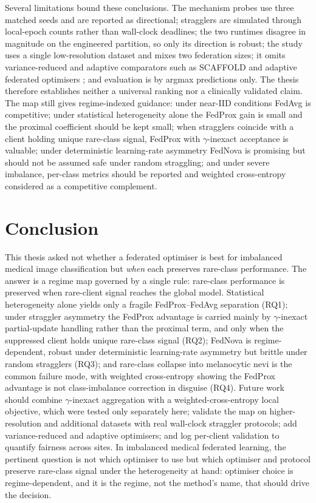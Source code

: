 \documentclass[11pt,a4paper]{report}
\begin{document}
Several limitations bound these conclusions. The mechanism probes use three
matched seeds and are reported as directional; stragglers are simulated through
local-epoch counts rather than wall-clock deadlines; the two runtimes disagree in
magnitude on the engineered partition, so only its direction is robust; the study
uses a single low-resolution dataset and mixes two federation sizes; it omits
variance-reduced and adaptive comparators such as SCAFFOLD
\citep{karimireddy2020scaffold} and adaptive federated optimisers
\citep{reddi2021adaptive}; and evaluation is by argmax predictions only. The
thesis therefore establishes neither a universal ranking nor a clinically
validated claim. The map still gives regime-indexed guidance: under near-IID
conditions FedAvg is competitive; under statistical heterogeneity alone the
FedProx gain is small and the proximal coefficient should be kept small; when
stragglers coincide with a client holding unique rare-class signal, FedProx with
$\gamma$-inexact acceptance is valuable; under deterministic learning-rate
asymmetry FedNova is promising but should not be assumed safe under random
straggling; and under severe imbalance, per-class metrics should be reported and
weighted cross-entropy considered as a competitive complement.

\section{Conclusion}
\label{sec:conc}

This thesis asked not whether a federated optimiser is best for imbalanced medical
image classification but \emph{when} each preserves rare-class performance. The
answer is a regime map governed by a single rule: rare-class performance is
preserved when rare-client signal reaches the global model. Statistical
heterogeneity alone yields only a fragile FedProx--FedAvg separation (RQ1); under
straggler asymmetry the FedProx advantage is carried mainly by $\gamma$-inexact
partial-update handling rather than the proximal term, and only when the
suppressed client holds unique rare-class signal (RQ2); FedNova is
regime-dependent, robust under deterministic learning-rate asymmetry but brittle
under random stragglers (RQ3); and rare-class collapse into melanocytic nevi is
the common failure mode, with weighted cross-entropy showing the FedProx advantage
is not class-imbalance correction in disguise (RQ4). Future work should combine
$\gamma$-inexact aggregation with a weighted-cross-entropy local objective, which
were tested only separately here; validate the map on higher-resolution and
additional datasets with real wall-clock straggler protocols; add variance-reduced
and adaptive optimisers; and log per-client validation to quantify fairness across
sites. In imbalanced medical federated learning, the pertinent question is not
which optimiser to use but which optimiser and protocol preserve rare-class signal
under the heterogeneity at hand: optimiser choice is regime-dependent, and it is
the regime, not the method's name, that should drive the decision.
\end{document}
